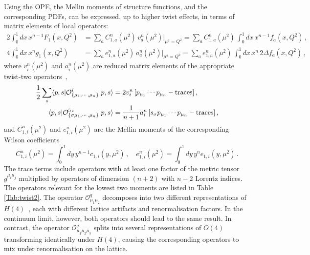 Using the OPE, the Mellin moments of structure functions, and the corresponding PDFs, can be expressed, up to higher twist effects, in terms of matrix elements of local operators:
\begin{align}
\!\!\!2 \int_0^1 dx\, x^{n-1} F_1(x,Q^2) &= \sum_a C_{1,a}^n(\mu^2)\, v_a^n(\mu^2)|_{\mu^2=Q^2} = \sum_a C_{1,a}^n(\mu^2)\, \int_0^1 dx\, x^{n-1} f_a(x,Q^2)\,,\\
4 \int_0^1 dx\, x^n g_1(x,Q^2) &= \sum_a e_{1,a}^n(\mu^2)\, a_a^n(\mu^2)|_{\mu^2=Q^2} = \sum_a e_{1,a}^n(\mu^2)\, \int_0^1 dx\, x^n\, 2 \Delta f_a(x,Q^2)\,,
\end{align}
where $v_i^n(\mu^2)$ and $a_i^n(\mu^2)$ are reduced matrix elements of the appropriate twist-two operators~\cite{Gockeler:1995wg},
\begin{align}
\frac{1}{2} \sum_s \langle p,s|\mathcal{O}^i_{\{\mu_1,\cdots,\mu_n\}}|p,s\rangle = {} & 2 v_i^n\, [p_{\mu_1}\cdots p_{\mu_n} - {\rm traces}] \,, \label{eq:twist2me}\\
\langle p,s|\mathcal{O}^{5\,i}_{\{\sigma \mu_1,\cdots,\mu_n\}}|p,s\rangle = {} & \frac{1}{n+1} a_i^n\, [s_\sigma p_{\mu_1}\cdots p_{\mu_n} - {\rm traces}]\,,
\end{align}
and $C_{1,i}^n(\mu^2)$ and $e_{1,i}^n(\mu^2)$ are the Mellin moments of the corresponding Wilson coefficients
\begin{equation}
C_{1,i}^n(\mu^2) = \int_0^1 dy\, y^{n-1} c_{1,i}(y,\mu^2)\,, \quad
e_{1,i}^n(\mu^2) = \int_0^1 dy\, y^n e_{1,i}(y,\mu^2)\,.
\end{equation}
The trace terms include operators with at least one factor of the metric tensor $g^{\mu_i \mu_j}$ multiplied by
operators of dimension $(n+2)$ with $n-2$ Lorentz indices. The operators relevant for the lowest two moments are listed in Table \ref{Tab:twist2}. The operator $\mathcal{O}^q_{\mu_1\mu_2}$ decomposes into two different representations of $H(4)$~\cite{Gockeler:1996mu}, each with different lattice artifacts and renormalisation factors. In the continuum limit, however, both operators should lead to the same result. In contrast, the operator $\mathcal{O}^q_{\mu_1\mu_2\mu_3}$ 
splits into several representations of $O(4)$ transforming identically 
under $H(4)$, causing the corresponding operators to mix under renormalisation 
on the lattice.

